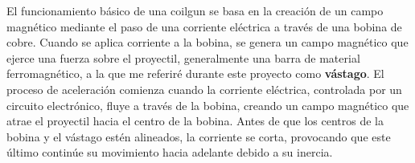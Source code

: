 El funcionamiento básico de una coilgun se basa en la creación de un campo magnético mediante el paso de una corriente eléctrica a través de una bobina de cobre. Cuando se aplica corriente a la bobina, se genera un campo magnético que ejerce una fuerza sobre el proyectil, generalmente una barra de material ferromagnético, a la que me referiré durante este proyecto como \textbf{vástago}. El proceso de aceleración comienza cuando la corriente eléctrica, controlada por un circuito electrónico, fluye a través de la bobina, creando un campo magnético que atrae el proyectil hacia el centro de la bobina. Antes de que los centros de la bobina y el vástago estén alineados, la corriente se corta, provocando que este último continúe su movimiento hacia adelante debido a su inercia.







